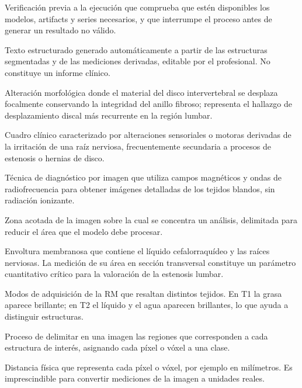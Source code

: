 \begin{description}[leftmargin=3.8cm, style=nextline, itemsep=3pt, topsep=3pt]
    \item[Preflight] Verificación previa a la ejecución que comprueba que estén disponibles los modelos, artifacts y series necesarios, y que interrumpe el proceso antes de generar un resultado no válido.

    \item[Preinforme] Texto estructurado generado automáticamente a partir de las estructuras segmentadas y de las mediciones derivadas, editable por el profesional. No constituye un informe clínico.

    \item[Protrusión discal] Alteración morfológica donde el material del disco intervertebral se desplaza focalmente conservando la integridad del anillo fibroso; representa el hallazgo de desplazamiento discal más recurrente en la región lumbar.

    \item[Radiculopatía] Cuadro clínico caracterizado por alteraciones sensoriales o motoras derivadas de la irritación de una raíz nerviosa, frecuentemente secundaria a procesos de estenosis o hernias de disco.

    \item[RM, resonancia magnética] Técnica de diagnóstico por imagen que utiliza campos magnéticos y ondas de radiofrecuencia para obtener imágenes detalladas de los tejidos blandos, sin radiación ionizante.

    \item[ROI, región de interés] Zona acotada de la imagen sobre la cual se concentra un análisis, delimitada para reducir el área que el modelo debe procesar.

    \item[Saco tecal (saco dural)] Envoltura membranosa que contiene el líquido cefalorraquídeo y las raíces nerviosas. La medición de su área en sección transversal constituye un parámetro cuantitativo crítico para la valoración de la estenosis lumbar.

    \item[Secuencias T1 y T2] Modos de adquisición de la RM que resaltan distintos tejidos. En T1 la grasa aparece brillante; en T2 el líquido y el agua aparecen brillantes, lo que ayuda a distinguir estructuras.

    \item[Segmentación] Proceso de delimitar en una imagen las regiones que corresponden a cada estructura de interés, asignando cada píxel o vóxel a una clase.

    \item[Spacing, espaciado] Distancia física que representa cada píxel o vóxel, por ejemplo en milímetros. Es imprescindible para convertir mediciones de la imagen a unidades reales.


\end{description}
